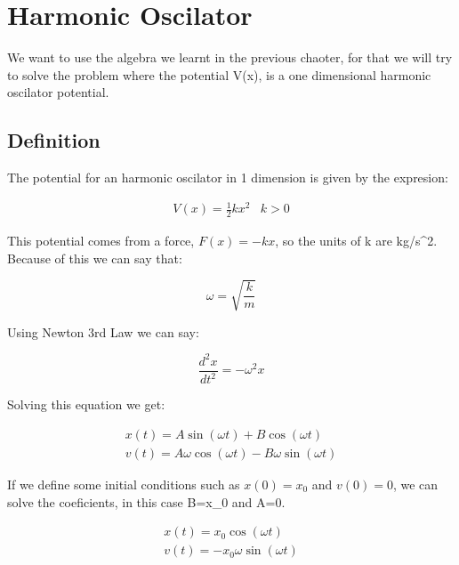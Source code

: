 \setchapterpreamble[u]{\margintoc}
\chapter{Harmonic Oscilator}

We want to use the algebra we learnt in the previous chaoter, for that we will try to solve the problem where the potential V(x), is a one dimensional harmonic oscilator potential.

\section{Definition}

The potential for an harmonic oscilator in 1 dimension is given by the expresion:

\begin{equation}
  \begin{array}{cc}
    V(x) = \frac{1}{2} k x^2 & k > 0
  \end{array}
\end{equation}

This potential comes from a force, $F(x) = -k x$, so the units of k are kg/s^2. Because of this we can say that:

\begin{equation}
  \omega=\sqrt{\frac{k}{m}}
\end{equation}

Using Newton 3rd Law we can say:

\begin{equation}
  \frac{d^2x}{dt^2}= -\omega^2 x
\end{equation}

Solving this equation we get:

\begin{equation}
  \begin{array}{c}
    x(t) = A \sin(\omega t) + B \cos(\omega t)
    \\
    v(t) = A\omega \cos(\omega t) - B\omega \sin(\omega t)
  \end{array}
\end{equation}

If we define some initial conditions such as $x(0)=x_0$ and $v(0)=0$, we can solve the coeficients, in this case B=x_0 and A=0.

\begin{equation}
  \begin{array}{c}
    x(t) = x_0 \cos(\omega t)
    \\
    v(t) =  - x_0 \omega \sin(\omega t)
  \end{array}
\end{equation}

